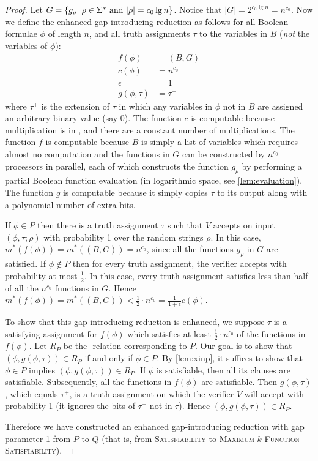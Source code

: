 \documentclass[]{article}
\begin{document}
\begin{proof}
  Let $G = \left\{g_\rho \,\middle|\, \rho \in \Sigma^* \textnormal{ and } |\rho| = c_0 \lg n \right\}$.
  Notice that $|G| = 2^{c_0 \lg n} = n^{c_0}$.
  Now we define the enhanced gap-introducing reduction as follows for all Boolean formulae $\phi$ of length $n$, and all truth assignments $\tau$ to the variables in $B$ (\emph{not} the variables of $\phi$):
  \begin{align*}
    f(\phi) & = (B, G) \\
    c(\phi) & = n^{c_0} \\
    \epsilon & = 1 \\
    g(\phi, \tau) & = \tau^+
  \end{align*}
  where $\tau^+$ is the extension of $\tau$ in which any variables in $\phi$ not in $B$ are assigned an arbitrary binary value (say 0).
  The function $c$ is \NC{} computable because multiplication is in \NC{}, and there are a constant number of multiplications.
  The function $f$ is \NC{} computable because $B$ is simply a list of variables which requires almost no computation and the functions in $G$ can be constructed by $n^{c_0}$ processors in parallel, each of which constructs the function $g_\rho$ by performing a partial Boolean function evaluation (in logarithmic space, see \autoref{lem:evaluation}).
  The function $g$ is \NC{} computable because it simply copies $\tau$ to its output along with a polynomial number of extra bits.

  If $\phi \in P$ then there is a truth assignment $\tau$ such that $V$ accepts on input $(\phi, \tau; \rho)$ with probability 1 over the random strings $\rho$.
  In this case, $m^*(f(\phi)) = m^*((B, G)) = n^{c_0}$, since all the functions $g_\rho$ in $G$ are satisfied.
  If $\phi \notin P$ then for every truth assignment, the verifier accepts with probability at most $\frac{1}{2}$.
  In this case, every truth assignment satisfies less than half of all the $n^{c_0}$ functions in $G$.
  Hence $m^*(f(\phi)) = m^*((B, G)) < \frac{1}{2} \cdot n^{c_0} = \frac{1}{1 + \epsilon} c(\phi)$.
  
  To show that this gap-introducing reduction is enhanced, we suppose $\tau$ is a satisfying assignment for $f(\phi)$ which satisfies at least $\frac{1}{2} \cdot n^{c_0}$ of the functions in $f(\phi)$.
  Let $R_P$ be the \NP-relation corresponding to $P$.
  Our goal is to show that $(\phi, g(\phi, \tau)) \in R_P$ if and only if $\phi \in P$.
  By \autoref{lem:xinp}, it suffices to show that $\phi \in P$ implies $(\phi, g(\phi, \tau)) \in R_P$.
  If $\phi$ is satisfiable, then all its clauses are satisfiable.
  Subsequently, all the functions in $f(\phi)$ are satisfiable.
  Then $g(\phi, \tau)$, which equals $\tau^+$, is a truth assignment on which the verifier $V$ will accept with probability 1 (it ignores the bits of $\tau^+$ not in $\tau$).
  Hence $(\phi, g(\phi, \tau)) \in R_P$.

  Therefore we have constructed an \NC{} enhanced gap-introducing reduction with gap parameter 1 from $P$ to $Q$ (that is, from \textsc{Satisfiability} to \textsc{Maximum $k$-Function Satisfiability}).
\end{proof}
\end{document}
